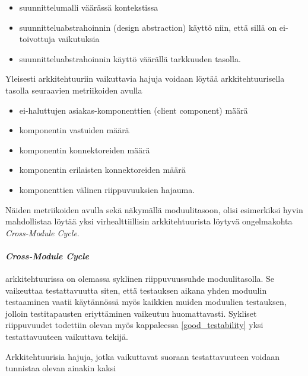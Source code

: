 \documentclass[finnish]{tktltiki2}
\numberwithin{table}{section}
\theoremstyle{definition}
\theoremstyle{remark}
\begin{document}
\begin{itemize}
	\item suunnittelumalli väärässä kontekstissa
	\item suunnitteluabstrahoinnin (design abstraction) käyttö niin, että sillä on ei-toivottuja vaikutuksia
	\item suunnitteluabstrahoinnin käyttö väärällä tarkkuuden tasolla.
\end{itemize} 


Yleisesti arkkitehtuuriin vaikuttavia hajuja voidaan löytää arkkitehtuurisella tasolla seuraavien metriikoiden avulla \citep{bertran_detecting_2011}

\begin{itemize}
	\item ei-haluttujen asiakas-komponenttien (client component) määrä
	\item komponentin vastuiden määrä
	\item komponentin konnektoreiden määrä
	\item komponentin erilaisten konnektoreiden määrä
	\item komponenttien välinen riippuvuuksien hajauma.
\end{itemize}


\noindent
Näiden metriikoiden avulla sekä näkymällä moduulitasoon, olisi esimerkiksi hyvin mahdollistaa löytää yksi virhealttiillisin arkkitehtuurista löytyvä ongelmakohta \citep[s. 57]{HotSpot} \textit{Cross-Module Cycle}.

\paragraph{\textit{Cross-Module Cycle}} arkkitehtuurissa on olemassa syklinen riippuvuussuhde moduulitasolla. Se vaikeuttaa testattavuutta siten, että testauksen aikana yhden moduulin testaaminen vaatii käytännössä myös kaikkien muiden moduulien testauksen, jolloin testitapausten eriyttäminen vaikeutuu huomattavasti. Sykliset riippuvuudet todettiin olevan myös kappaleessa \ref{good_testability} yksi testattavuuteen vaikuttava tekijä.


Arkkitehtuurisia hajuja, jotka vaikuttavat suoraan testattavuuteen voidaan tunnistaa olevan ainakin kaksi \citep{garcia_identifying_2009}
\end{document}
